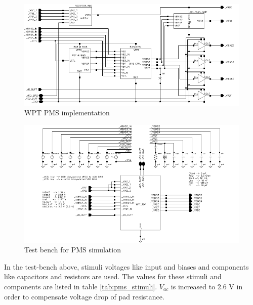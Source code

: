 \documentclass[UKenglish]{ifimaster}  %
\begin{document}
\begin{figure} [H]
  \centering
  \includegraphics[width=\textwidth]{img/wpt_top.pdf} 
 \caption{WPT PMS implementation} 
\label{fig:wpt_top} 
\end{figure}

\vspace{5mm}

\begin{figure} [H]
  \centering
  \includegraphics[width=\textwidth]{img/wpt_top_testbench.pdf} 
 \caption{Test bench for PMS simulation } 
\label{fig:wpt_top_testbench} 
\end{figure}

In the test-bench above, stimuli voltages like input and biases and components like capacitors and resistors are used. 
The values for these stimuli and components are listed in table \ref{tab:pms_stimuli}. $V_{ac} $ is increased to 2.6 V in
order to compensate voltage drop of pad resistance.
\end{document}
